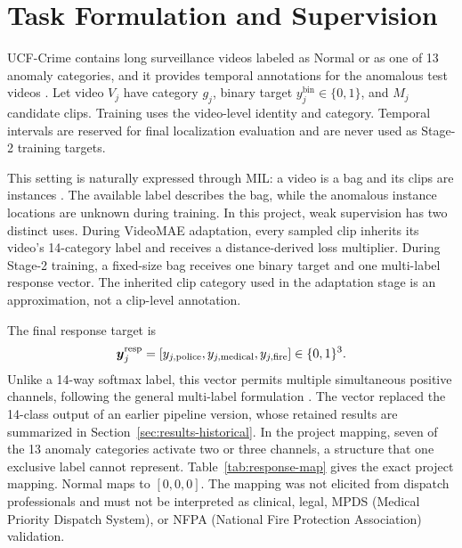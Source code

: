 \section{Task Formulation and Supervision}
\label{sec:task-formulation}

UCF-Crime contains long surveillance videos labeled as Normal or as one of 13 anomaly categories, and it provides temporal annotations for the anomalous test videos \cite{sultani2018real}. Let video $V_j$ have category $g_j$, binary target $y_j^{\mathrm{bin}}\in\{0,1\}$, and $M_j$ candidate clips. Training uses the video-level identity and category. Temporal intervals are reserved for final localization evaluation and are never used as Stage-2 training targets.

This setting is naturally expressed through MIL: a video is a bag and its clips are instances \cite{dietterich1997solving,carbonneau2018multiple}. The available label describes the bag, while the anomalous instance locations are unknown during training. In this project, weak supervision has two distinct uses. During VideoMAE adaptation, every sampled clip inherits its video's 14-category label and receives a distance-derived loss multiplier. During Stage-2 training, a fixed-size bag receives one binary target and one multi-label response vector. The inherited clip category used in the adaptation stage is an approximation, not a clip-level annotation.

The final response target is
\begin{equation}
    \boldsymbol{y}^{\mathrm{resp}}_j
    = [y_{j,\mathrm{police}},y_{j,\mathrm{medical}},y_{j,\mathrm{fire}}]
    \in\{0,1\}^{3}.
\end{equation}
Unlike a 14-way softmax label, this vector permits multiple simultaneous positive channels, following the general multi-label formulation \cite{boutell2004learning,tsoumakas2007multi}. The vector replaced the 14-class output of an earlier pipeline version, whose retained results are summarized in Section~\ref{sec:results-historical}. In the project mapping, seven of the 13 anomaly categories activate two or three channels, a structure that one exclusive label cannot represent. Table~\ref{tab:response-map} gives the exact project mapping. Normal maps to $[0,0,0]$. The mapping was not elicited from dispatch professionals and must not be interpreted as clinical, legal, MPDS (Medical Priority Dispatch System), or NFPA (National Fire Protection Association) validation.

